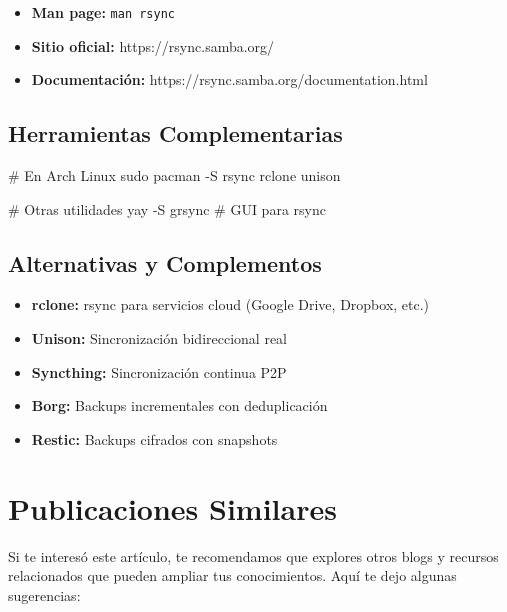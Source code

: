 \documentclass[
  doc,
  floatsintext,
  longtable,
  a4paper,
  nolmodern,
  notxfonts,
  notimes,
  12pt,
  colorlinks=true,linkcolor=blue,citecolor=blue,urlcolor=blue]{apa7}
\newenvironment{Shaded}{\begin{snugshade}}{\end{snugshade}}
\newcommand{\AttributeTok}[1]{\textcolor[rgb]{0.40,0.45,0.13}{#1}}
\newcommand{\CommentTok}[1]{\textcolor[rgb]{0.37,0.37,0.37}{#1}}
\newcommand{\ExtensionTok}[1]{\textcolor[rgb]{0.00,0.23,0.31}{#1}}
\newcommand{\FunctionTok}[1]{\textcolor[rgb]{0.28,0.35,0.67}{#1}}
\newcommand{\NormalTok}[1]{\textcolor[rgb]{0.00,0.23,0.31}{#1}}
\providecommand{\tightlist}{%
  \setlength{\itemsep}{0pt}\setlength{\parskip}{0pt}}
\begin{document}
\begin{itemize}
\tightlist
\item
  \textbf{Man page:} \texttt{man\ rsync}
\item
  \textbf{Sitio oficial:} https://rsync.samba.org/
\item
  \textbf{Documentación:} https://rsync.samba.org/documentation.html
\end{itemize}

\subsection{Herramientas
Complementarias}\label{herramientas-complementarias}

\begin{Shaded}
\begin{Highlighting}[]
\CommentTok{\# En Arch Linux}
\FunctionTok{sudo}\NormalTok{ pacman }\AttributeTok{{-}S}\NormalTok{ rsync rclone unison}

\CommentTok{\# Otras utilidades}
\ExtensionTok{yay} \AttributeTok{{-}S}\NormalTok{ grsync  }\CommentTok{\# GUI para rsync}
\end{Highlighting}
\end{Shaded}

\subsection{Alternativas y
Complementos}\label{alternativas-y-complementos}

\begin{itemize}
\tightlist
\item
  \textbf{rclone:} rsync para servicios cloud (Google Drive, Dropbox,
  etc.)
\item
  \textbf{Unison:} Sincronización bidireccional real
\item
  \textbf{Syncthing:} Sincronización continua P2P
\item
  \textbf{Borg:} Backups incrementales con deduplicación
\item
  \textbf{Restic:} Backups cifrados con snapshots
\end{itemize}

\section{Publicaciones Similares}\label{publicaciones-similares}

Si te interesó este artículo, te recomendamos que explores otros blogs y
recursos relacionados que pueden ampliar tus conocimientos. Aquí te dejo
algunas sugerencias:
\end{document}
